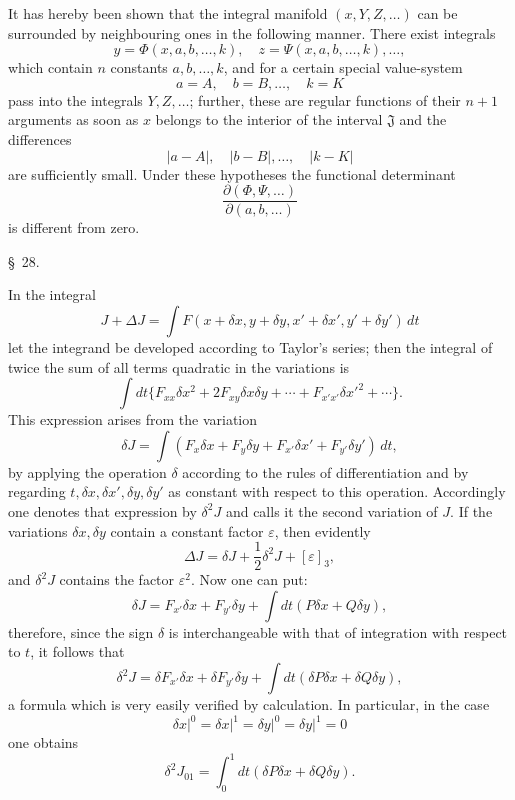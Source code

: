 \documentclass[11pt,a4paper,leqno]{article}
\begin{document}
It has hereby been shown that the integral manifold $(x,Y,Z,\ldots)$ can be surrounded by neighbouring ones in the following manner. There exist integrals
\[
y=\Phi(x,a,b,\ldots,k),\quad z=\Psi(x,a,b,\ldots,k),\ldots,
\]
which contain $n$ constants $a,b,\ldots,k$, and for a certain special value-system
\[
a=A,\quad b=B,\ldots,\quad k=K
\]
pass into the integrals $Y,Z,\ldots$; further, these are regular functions of their $n+1$ arguments as soon as $x$ belongs to the interior of the interval $\mathfrak J$ and the differences
\[
|a-A|,\quad |b-B|,\ldots,\quad |k-K|
\]
are sufficiently small. Under these hypotheses the functional determinant
\[
\frac{\partial(\Phi,\Psi,\ldots)}{\partial(a,b,\ldots)}
\]
is different from zero.

\begin{center}{\large \S~28.}\end{center}

In the integral
\[
J+\Delta J=\int F(x+\delta x,y+\delta y,x'+\delta x',y'+\delta y')\,dt
\]
let the integrand be developed according to Taylor's series; then the integral of twice the sum of all terms quadratic in the variations is
\[
\int dt\{F_{xx}\delta x^2+2F_{xy}\delta x\delta y+\cdots+F_{x'x'}\delta x'^2+\cdots\}.
\]
This expression arises from the variation
\[
\delta J=\int(F_x\delta x+F_y\delta y+F_{x'}\delta x'+F_{y'}\delta y')\,dt,
\]
by applying the operation $\delta$ according to the rules of differentiation and by regarding $t,\delta x,\delta x',\delta y,\delta y'$ as constant with respect to this operation. Accordingly one denotes that expression by $\delta^2J$ and calls it the second variation of $J$. If the variations $\delta x,\delta y$ contain a constant factor $\varepsilon$, then evidently
\begin{equation}\tag{88}
\Delta J=\delta J+\frac12\delta^2J+[\varepsilon]_3,
\end{equation}
and $\delta^2J$ contains the factor $\varepsilon^2$. Now one can put:
\[
\delta J=F_{x'}\delta x+F_{y'}\delta y+
\int dt(P\delta x+Q\delta y),
\]
therefore, since the sign $\delta$ is interchangeable with that of integration with respect to $t$, it follows that
\[
\delta^2J=\delta F_{x'}\delta x+\delta F_{y'}\delta y+
\int dt(\delta P\delta x+\delta Q\delta y),
\]
a formula which is very easily verified by calculation. In particular, in the case
\[
\left.\delta x\right|^0=\left.\delta x\right|^1=
\left.\delta y\right|^0=\left.\delta y\right|^1=0
\]
one obtains
\[
\delta^2J_{01}=\int_0^1dt(\delta P\delta x+
\delta Q\delta y).
\]
\end{document}
